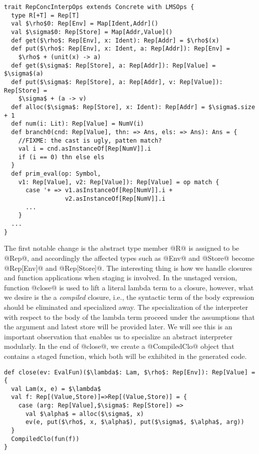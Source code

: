 \begin{lstlisting}
trait RepConcInterpOps extends Concrete with LMSOps {
  type R[+T] = Rep[T]
  val $\rho$0: Rep[Env] = Map[Ident,Addr]()
  val $\sigma$0: Rep[Store] = Map[Addr,Value]()
  def get($\rho$: Rep[Env], x: Ident): Rep[Addr] = $\rho$(x)
  def put($\rho$: Rep[Env], x: Ident, a: Rep[Addr]): Rep[Env] = 
    $\rho$ + (unit(x) -> a)
  def get($\sigma$: Rep[Store], a: Rep[Addr]): Rep[Value] = $\sigma$(a)
  def put($\sigma$: Rep[Store], a: Rep[Addr], v: Rep[Value]): Rep[Store] = 
    $\sigma$ + (a -> v)
  def alloc($\sigma$: Rep[Store], x: Ident): Rep[Addr] = $\sigma$.size + 1
  def num(i: Lit): Rep[Value] = NumV(i)
  def branch0(cnd: Rep[Value], thn: => Ans, els: => Ans): Ans = {
    //FIXME: the cast is ugly, patten match?
    val i = cnd.asInstanceOf[Rep[NumV]].i
    if (i == 0) thn else els
  }
  def prim_eval(op: Symbol, 
    v1: Rep[Value], v2: Rep[Value]): Rep[Value] = op match {
      case '+ => v1.asInstanceOf[Rep[NumV]].i + 
                 v2.asInstanceOf[Rep[NumV]].i
      ...
    }
  ...
}
\end{lstlisting}

The first notable change is the abstract type member @R@ is assigned to be @Rep@, and accordingly the affected 
types such as @Env@ and @Store@ become @Rep[Env]@ and @Rep[Store]@. 
The interesting thing is how we handle closures and function applications when staging is involved.
In the unstaged version, function @close@ is used to lift a literal lambda term to a closure, 
however, what we desire is the a \textit{compiled} closure, i.e., the syntactic term of the body expression should be
eliminated and specialized away.
The specialization of the interpreter with respect to the body of the lambda term proceed under the
assumptions that the argument and latest store will be provided later. 
We will see this is an important observation that enables us to specialize an abstract interpreter modularly.
In the end of @close@, we create a @CompiledClo@ object that contains a staged function, which both will be
exhibited in the generated code.

\begin{lstlisting}
def close(ev: EvalFun)($\lambda$: Lam, $\rho$: Rep[Env]): Rep[Value] = {
  val Lam(x, e) = $\lambda$
  val f: Rep[(Value,Store)]=>Rep[(Value,Store)] = { 
    case (arg: Rep[Value],$\sigma$: Rep[Store]) =>
      val $\alpha$ = alloc($\sigma$, x)
      ev(e, put($\rho$, x, $\alpha$), put($\sigma$, $\alpha$, arg)) 
  }
  CompiledClo(fun(f))
}
\end{lstlisting}

